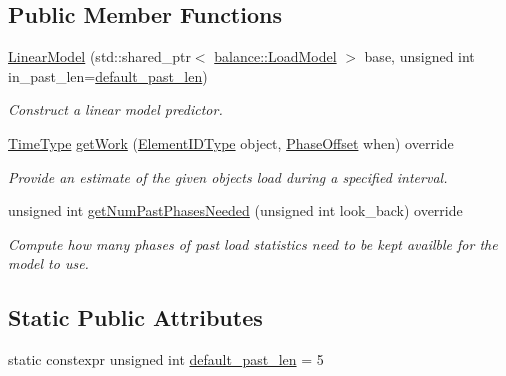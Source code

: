 \subsection*{Public Member Functions}
\begin{DoxyCompactItemize}
\item 
\hyperlink{structvt_1_1vrt_1_1collection_1_1balance_1_1_linear_model_a90fff488014731417431b35295a263d7}{Linear\+Model} (std\+::shared\+\_\+ptr$<$ \hyperlink{classvt_1_1vrt_1_1collection_1_1balance_1_1_load_model}{balance\+::\+Load\+Model} $>$ base, unsigned int in\+\_\+past\+\_\+len=\hyperlink{structvt_1_1vrt_1_1collection_1_1balance_1_1_linear_model_a5735a20dfd17fb2804a1b9b90d5649d1}{default\+\_\+past\+\_\+len})
\begin{DoxyCompactList}\small\item\em Construct a linear model predictor. \end{DoxyCompactList}\item 
\hyperlink{namespacevt_a876a9d0cd5a952859c72de8a46881442}{Time\+Type} \hyperlink{structvt_1_1vrt_1_1collection_1_1balance_1_1_linear_model_a21150f198d266175ea015c0caebad5b5}{get\+Work} (\hyperlink{namespacevt_1_1vrt_1_1collection_1_1balance_a14c8d2c972f2913aa3f1636e5be0a120}{Element\+I\+D\+Type} object, \hyperlink{structvt_1_1vrt_1_1collection_1_1balance_1_1_phase_offset}{Phase\+Offset} when) override
\begin{DoxyCompactList}\small\item\em Provide an estimate of the given object\textquotesingle{}s load during a specified interval. \end{DoxyCompactList}\item 
unsigned int \hyperlink{structvt_1_1vrt_1_1collection_1_1balance_1_1_linear_model_a454177a512bbb73e246d3a7ad823c8e4}{get\+Num\+Past\+Phases\+Needed} (unsigned int look\+\_\+back) override
\begin{DoxyCompactList}\small\item\em Compute how many phases of past load statistics need to be kept availble for the model to use. \end{DoxyCompactList}\end{DoxyCompactItemize}
\subsection*{Static Public Attributes}
\begin{DoxyCompactItemize}
\item 
static constexpr unsigned int \hyperlink{structvt_1_1vrt_1_1collection_1_1balance_1_1_linear_model_a5735a20dfd17fb2804a1b9b90d5649d1}{default\+\_\+past\+\_\+len} = 5
\end{DoxyCompactItemize}
